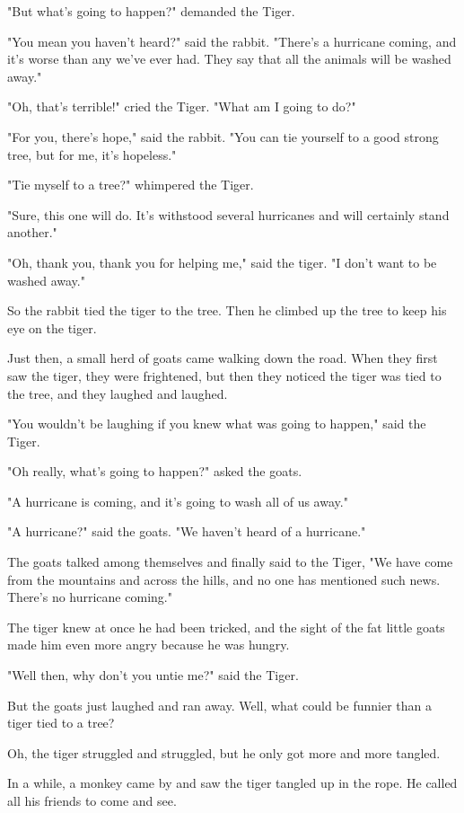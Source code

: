 "But what's going to happen?" demanded the Tiger.

"You mean you haven't heard?" said the rabbit. "There's a hurricane coming, and it's worse than any we've ever had. They say that all the animals will be washed away."

"Oh, that's terrible!" cried the Tiger. "What am I going to do?"

"For you, there's hope," said the rabbit. "You can tie yourself to a good strong tree, but for me, it's hopeless."

"Tie myself to a tree?" whimpered the Tiger.

"Sure, this one will do. It's withstood several hurricanes and will certainly stand another."

"Oh, thank you, thank you for helping me," said the tiger. "I don't want to be washed away."

So the rabbit tied the tiger to the tree. Then he climbed up the tree to keep his eye on the tiger.

Just then, a small herd of goats came walking down the road. When they first saw the tiger, they were frightened, but then they noticed the tiger was tied to the tree, and they laughed and laughed.

"You wouldn't be laughing if you knew what was going to happen," said the Tiger.

"Oh really, what's going to happen?" asked the goats.

"A hurricane is coming, and it's going to wash all of us away."

"A hurricane?" said the goats. "We haven't heard of a hurricane."

The goats talked among themselves and finally said to the Tiger, "We have come from the mountains and across the hills, and no one has mentioned such news. There's no hurricane coming."

The tiger knew at once he had been tricked, and the sight of the fat little goats made him even more angry because he was hungry.

"Well then, why don't you untie me?" said the Tiger.

But the goats just laughed and ran away. Well, what could be funnier than a tiger tied to a tree?

Oh, the tiger struggled and struggled, but he only got more and more tangled.

In a while, a monkey came by and saw the tiger tangled up in the rope. He called all his friends to come and see.

